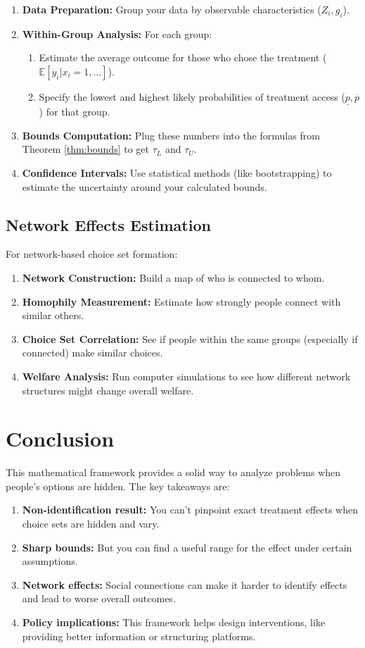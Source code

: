 \documentclass{article}
\newcommand{\E}{\mathbb{E}}
\begin{document}
\begin{enumerate}
\item \textbf{Data Preparation:} Group your data by observable characteristics ($Z_i, g_i$).
\item \textbf{Within-Group Analysis:} For each group:
   \begin{enumerate}
       \item Estimate the average outcome for those who chose the treatment ($\E[y_i | x_i = 1, \ldots]$).
       \item Specify the lowest and highest likely probabilities of treatment access ($\underline{p}, \overline{p}$) for that group.
   \end{enumerate}
\item \textbf{Bounds Computation:} Plug these numbers into the formulas from Theorem \ref{thm:bounds} to get $\tau_L$ and $\tau_U$.
\item \textbf{Confidence Intervals:} Use statistical methods (like bootstrapping) to estimate the uncertainty around your calculated bounds.
\end{enumerate}

\subsection{Network Effects Estimation}

For network-based choice set formation:
\begin{enumerate}
\item \textbf{Network Construction:} Build a map of who is connected to whom.
\item \textbf{Homophily Measurement:} Estimate how strongly people connect with similar others.
\item \textbf{Choice Set Correlation:} See if people within the same groups (especially if connected) make similar choices.
\item \textbf{Welfare Analysis:} Run computer simulations to see how different network structures might change overall welfare.
\end{enumerate}

\section{Conclusion}

This mathematical framework provides a solid way to analyze problems when people's options are hidden. The key takeaways are:

\begin{enumerate}
\item \textbf{Non-identification result:} You can't pinpoint exact treatment effects when choice sets are hidden and vary.
\item \textbf{Sharp bounds:} But you can find a useful range for the effect under certain assumptions.
\item \textbf{Network effects:} Social connections can make it harder to identify effects and lead to worse overall outcomes.
\item \textbf{Policy implications:} This framework helps design interventions, like providing better information or structuring platforms.
\end{enumerate}
\end{document}
